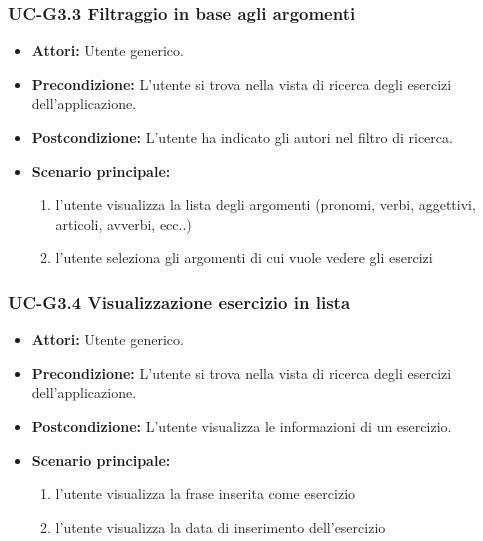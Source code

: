 	\subsubsection{UC-G3.3 Filtraggio in base agli argomenti}
		\begin{itemize}
			\item \textbf{Attori:} Utente generico.
			\item \textbf{Precondizione: } L'utente si trova nella vista di ricerca degli esercizi dell'applicazione.
			\item \textbf{Postcondizione: } L'utente ha indicato gli autori nel filtro di ricerca.
			\item \textbf{Scenario principale:}
			\begin{enumerate}
				\item l'utente visualizza la lista degli argomenti (pronomi, verbi, aggettivi, articoli, avverbi, ecc..)
				\item l'utente seleziona gli argomenti di cui vuole vedere gli esercizi
			\end{enumerate}
		\end{itemize}
		
\subsubsection{UC-G3.4 Visualizzazione esercizio in lista}
		\begin{itemize}
			\item \textbf{Attori:} Utente generico.
			\item \textbf{Precondizione: } L'utente si trova nella vista di ricerca degli esercizi dell'applicazione.
			\item \textbf{Postcondizione: } L'utente visualizza le informazioni di un esercizio.
			\item \textbf{Scenario principale:}
			\begin{enumerate}
				\item l'utente visualizza la frase inserita come esercizio
				\item l'utente visualizza la data di inserimento dell'esercizio
			\end{enumerate}
		\end{itemize}

